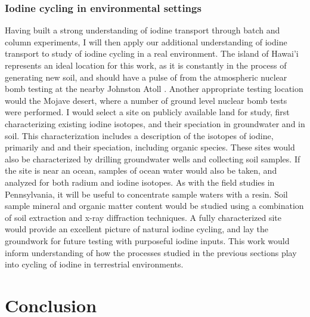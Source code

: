 \documentclass[twoside,12pt,titlepage]{article}
\newcommand{\isotope}[2]{\ch{^{#1}#2}}
\begin{document}
\subsubsection{Iodine cycling in environmental settings}
Having built a strong understanding of iodine transport through batch and column experiments, I will then apply our additional understanding of iodine transport to study of iodine cycling in a real environment. The island of Hawai'i represents an ideal location for this work, as it is constantly in the process of generating new soil, and should have a pulse of \isotope{129}{I} from the atmospheric nuclear bomb testing at the nearby Johnston Atoll \cite{WikiStarfishPrime}. Another appropriate testing location would the Mojave desert, where a number of ground level nuclear bomb tests were performed. I would select a site on publicly available land for study, first characterizing existing iodine isotopes, and their speciation in groundwater and in soil. This characterization includes a description of the isotopes of iodine, primarily \isotope{127}{I} and \isotope{129}{I} and their speciation, including organic species. These sites would also be characterized by drilling groundwater wells and collecting soil samples. If the site is near an ocean, samples of ocean water would also be taken, and analyzed for both radium and iodine isotopes. As with the field studies in Pennsylvania, it will be useful to concentrate sample waters with a resin. Soil sample mineral and organic matter content would be studied using a combination of soil extraction and x-ray diffraction techniques. A fully characterized site would provide an excellent picture of natural iodine cycling, and lay the groundwork for future testing with purposeful iodine inputs. This work would inform understanding of how the processes studied in the previous sections play into cycling of iodine in terrestrial environments.


\section{Conclusion}
\end{document}
